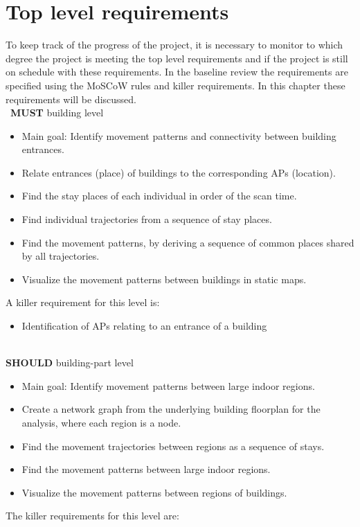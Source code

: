 \section{Top level requirements}
To keep track of the progress of the project, it is necessary to monitor to which degree the project is meeting the top level requirements and if the project is still on schedule with these requirements. In the baseline review the requirements are specified using the MoSCoW rules and killer requirements. In this chapter these requirements will be discussed.\\\
\textbf{MUST} building level
\begin{itemize}
\item Main goal: Identify movement patterns and connectivity between building entrances.
\item {\color{black!50}Relate entrances (place) of buildings to the corresponding APs (location).}
\item Find the stay places of each individual in order of the scan time.
\item Find individual trajectories from a sequence of stay places.
\item Find the movement patterns, by deriving a sequence of common places shared by all trajectories.
\item Visualize the movement patterns between buildings in static maps.
\end{itemize}
A killer requirement for this level is:
\begin{itemize}
\item {\color{black!50}Identification of APs relating to an entrance of a building}\\\\
\end{itemize}
\textbf{SHOULD} building-part level 
\begin{itemize}
\item Main goal: Identify movement patterns between large indoor regions. 
\item Create a network graph from the underlying building floorplan for the analysis, where each region is a node.
\item {\color{black!50}Find the movement trajectories between regions as a sequence of stays.}
\item Find the movement patterns between large indoor regions.
\item Visualize the movement patterns between regions of buildings.
\end{itemize}
The killer requirements for this level are:
